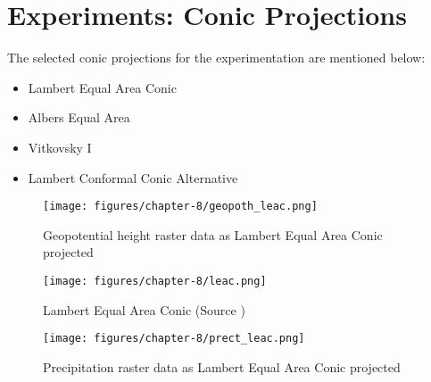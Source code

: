 \newpage
\section{Experiments: Conic Projections}
The selected conic projections for the experimentation are mentioned below:
\begin{itemize}
    \item Lambert Equal Area Conic
    \item Albers Equal Area
    \item Vitkovsky I
    \item Lambert Conformal Conic Alternative
\end{itemize}


\begin{figure}[H]
    \centering
    \begin{minipage}{0.30\textwidth}
        \centering
        \texttt{[image: figures/chapter-8/geopoth\_leac.png]}
        \caption{ Geopotential height raster data as Lambert Equal Area Conic projected}
        \label{fig:leac_geopoth_raster}
    \end{minipage}\hfill
    \begin{minipage}{0.30\textwidth}
        \centering
        \texttt{[image: figures/chapter-8/leac.png]}
        \caption{Lambert Equal Area Conic (Source \cite{PROJ_SITE})}
        \label{fig:leac_proj}
    \end{minipage}\hfill
    \begin{minipage}{0.30\textwidth}
        \centering
        \texttt{[image: figures/chapter-8/prect\_leac.png]}
        \caption{Precipitation raster data as Lambert Equal Area Conic projected}
        \label{fig:leac_prect_raster}
    \end{minipage}\hfill
\end{figure}
